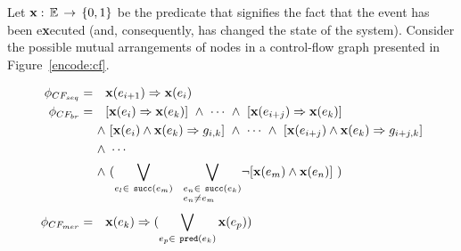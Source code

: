 Let $\mathbf{x}:\,\mathbb{E}\,\rightarrow\,\{0,1\}$ be the predicate that signifies the fact that the event has been e\textbf{x}ecuted (and, consequently, has changed the state of the system).
Consider the possible mutual arrangements of nodes in a control-flow graph presented in Figure~\ref{encode:cf}.

\begin{align}
\phi_{CF_{seq}} \defeq \quad & \fx(e_{i+1}) \Rightarrow \fx(e_i) \label{enc:cf:seq} \\
\phi_{CF_{br}}  \defeq \quad & [\fx(e_i) \Rightarrow \fx(e_k)] \ \land \ \cdots \ \land \ [\fx(e_{i+j}) \Rightarrow \fx(e_k)] \nonumber \\
                       \land & \ [\fx(e_i) \land \fx(e_k) \Rightarrow g_{i,k}] \ \land \ \cdots \ \land \ [\fx(e_{i+j}) \land \fx(e_k) \Rightarrow g_{i+j,k}] \nonumber \\
                       \land & \ \cdots \nonumber \\
                       \land & \ ( \bigvee_{e_l \in \ \texttt{succ}(e_m)} \ \
                               \bigvee_{\begin{subarray}{l}e_n \in \ \texttt{succ}(e_k) \\ e_n \neq e_m\end{subarray}} 
                              \! \lnot [\fx(e_m) \land \fx(e_n)] \ ) \label{enc:cf:br} \\
\phi_{CF_{mer}} \defeq \quad & \fx(e_k) \Rightarrow (\bigvee\limits_{e_p \in \ \texttt{pred}(e_k)}^{} \fx(e_p)) \label{enc:cf:merge}
\end{align}

